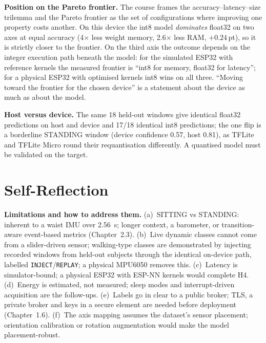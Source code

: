 \documentclass[10pt,a4paper]{article}
\begin{document}
\textbf{Position on the Pareto frontier.} The course frames the accuracy--latency--size trilemma and the Pareto frontier as the set of configurations where improving one property costs another. On this device the int8 model \emph{dominates} float32 on two axes at equal accuracy (4$\times$ less weight memory, 2.6$\times$ less RAM, $+0.24$\,pt), so it is strictly closer to the frontier. On the third axis the outcome depends on the integer execution path beneath the model: for the simulated ESP32 with reference kernels the measured frontier is ``int8 for memory, float32 for latency''; for a physical ESP32 with optimised kernels int8 wins on all three. ``Moving toward the frontier for the chosen device'' is a statement about the device as much as about the model.

\textbf{Host versus device.} The same 18 held-out windows give identical float32 predictions on host and device and 17/18 identical int8 predictions; the one flip is a borderline STANDING window (device confidence 0.57, host 0.81), as TFLite and TFLite Micro round their requantisation differently. A quantised model must be validated on the target.

\section{Self-Reflection}

\textbf{Limitations and how to address them.} (a)~SITTING vs STANDING: inherent to a waist IMU over \SI{2.56}{s}; longer context, a barometer, or transition-aware event-based metrics (Chapter~2.3). (b)~Live dynamic classes cannot come from a slider-driven sensor; walking-type classes are demonstrated by injecting recorded windows from held-out subjects through the identical on-device path, labelled \texttt{INJECT}/\texttt{REPLAY}; a physical MPU6050 removes this. (c)~Latency is simulator-bound; a physical ESP32 with ESP-NN kernels would complete H4. (d)~Energy is estimated, not measured; sleep modes and interrupt-driven acquisition are the follow-ups. (e)~Labels go in clear to a public broker; TLS, a private broker and keys in a secure element are needed before deployment (Chapter~1.6). (f)~The axis mapping assumes the dataset's sensor placement; orientation calibration or rotation augmentation would make the model placement-robust.
\end{document}
